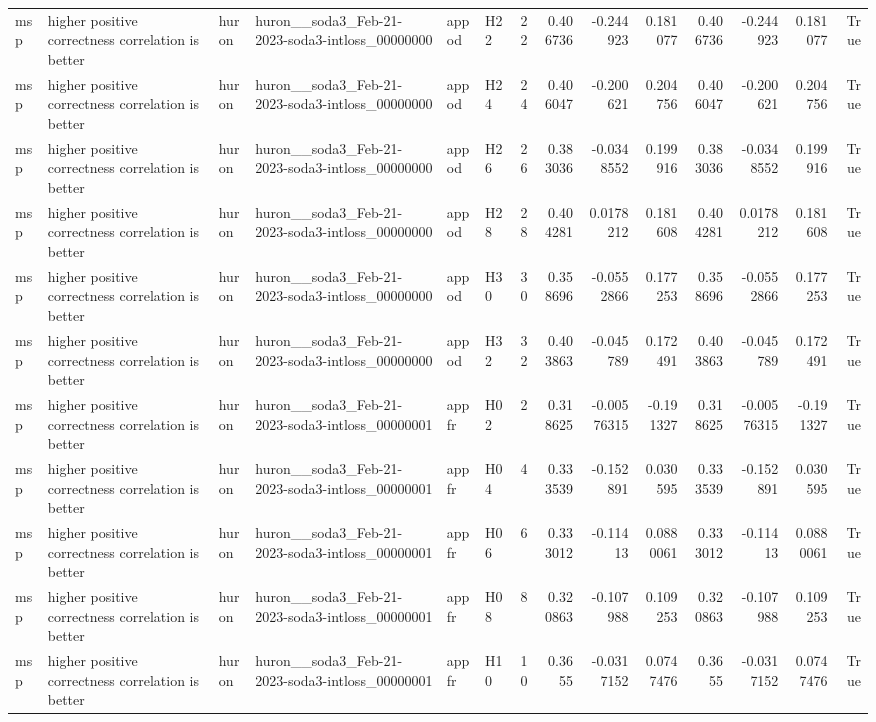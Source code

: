 \begin{longtable}{llllllrrrrrrrr}
msp & higher positive correctness correlation is better & huron & huron\_\_soda3\_Feb-21-2023-soda3-intloss\_00000000 & appod & H22 & 22 & 0.406736 & -0.244923 & 0.181077 & 0.406736 & -0.244923 & 0.181077 & True \\
msp & higher positive correctness correlation is better & huron & huron\_\_soda3\_Feb-21-2023-soda3-intloss\_00000000 & appod & H24 & 24 & 0.406047 & -0.200621 & 0.204756 & 0.406047 & -0.200621 & 0.204756 & True \\
msp & higher positive correctness correlation is better & huron & huron\_\_soda3\_Feb-21-2023-soda3-intloss\_00000000 & appod & H26 & 26 & 0.383036 & -0.0348552 & 0.199916 & 0.383036 & -0.0348552 & 0.199916 & True \\
msp & higher positive correctness correlation is better & huron & huron\_\_soda3\_Feb-21-2023-soda3-intloss\_00000000 & appod & H28 & 28 & 0.404281 & 0.0178212 & 0.181608 & 0.404281 & 0.0178212 & 0.181608 & True \\
msp & higher positive correctness correlation is better & huron & huron\_\_soda3\_Feb-21-2023-soda3-intloss\_00000000 & appod & H30 & 30 & 0.358696 & -0.0552866 & 0.177253 & 0.358696 & -0.0552866 & 0.177253 & True \\
msp & higher positive correctness correlation is better & huron & huron\_\_soda3\_Feb-21-2023-soda3-intloss\_00000000 & appod & H32 & 32 & 0.403863 & -0.045789 & 0.172491 & 0.403863 & -0.045789 & 0.172491 & True \\
msp & higher positive correctness correlation is better & huron & huron\_\_soda3\_Feb-21-2023-soda3-intloss\_00000001 & appfr & H02 & 2 & 0.318625 & -0.00576315 & -0.191327 & 0.318625 & -0.00576315 & -0.191327 & True \\
msp & higher positive correctness correlation is better & huron & huron\_\_soda3\_Feb-21-2023-soda3-intloss\_00000001 & appfr & H04 & 4 & 0.333539 & -0.152891 & 0.030595 & 0.333539 & -0.152891 & 0.030595 & True \\
msp & higher positive correctness correlation is better & huron & huron\_\_soda3\_Feb-21-2023-soda3-intloss\_00000001 & appfr & H06 & 6 & 0.333012 & -0.11413 & 0.0880061 & 0.333012 & -0.11413 & 0.0880061 & True \\
msp & higher positive correctness correlation is better & huron & huron\_\_soda3\_Feb-21-2023-soda3-intloss\_00000001 & appfr & H08 & 8 & 0.320863 & -0.107988 & 0.109253 & 0.320863 & -0.107988 & 0.109253 & True \\
msp & higher positive correctness correlation is better & huron & huron\_\_soda3\_Feb-21-2023-soda3-intloss\_00000001 & appfr & H10 & 10 & 0.3655 & -0.0317152 & 0.0747476 & 0.3655 & -0.0317152 & 0.0747476 & True \\

\end{longtable}
